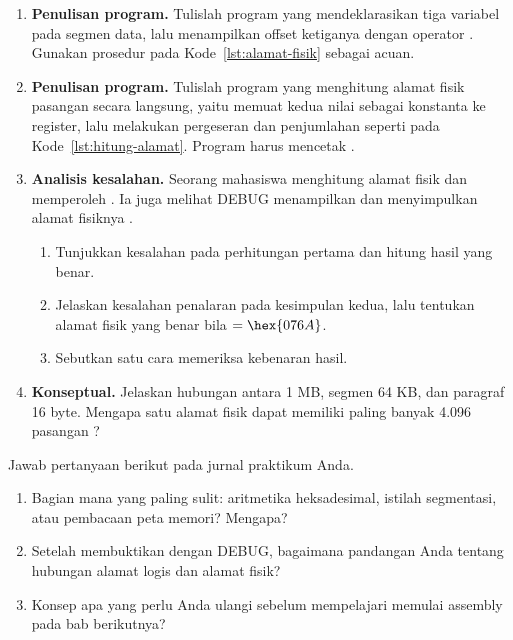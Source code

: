 \begin{enumerate}
    \item \textbf{Penulisan program.} Tulislah program yang
          mendeklarasikan tiga variabel pada segmen data, lalu
          menampilkan offset ketiganya dengan operator
          . Gunakan prosedur  pada
          Kode~\ref{lst:alamat-fisik} sebagai acuan.

    \item \textbf{Penulisan program.} Tulislah program yang
          menghitung alamat fisik pasangan 
          secara langsung, yaitu memuat kedua nilai sebagai
          konstanta ke register, lalu melakukan pergeseran dan
          penjumlahan seperti pada Kode~\ref{lst:hitung-alamat}.
          Program harus mencetak .

    \item \textbf{Analisis kesalahan.} Seorang mahasiswa menghitung
          alamat fisik  dan memperoleh
          . Ia juga melihat DEBUG menampilkan
           dan menyimpulkan alamat fisiknya
          .
          \begin{enumerate}
              \item Tunjukkan kesalahan pada perhitungan pertama
                    dan hitung hasil yang benar.
              \item Jelaskan kesalahan penalaran pada kesimpulan
                    kedua, lalu tentukan alamat fisik yang benar
                    bila  $= \hex{076A}$.
              \item Sebutkan satu cara memeriksa kebenaran hasil.
          \end{enumerate}

    \item \textbf{Konseptual.} Jelaskan hubungan antara 1 MB,
          segmen 64 KB, dan paragraf 16 byte. Mengapa satu alamat
          fisik dapat memiliki paling banyak 4.096 pasangan
          ?
\end{enumerate}

\begin{refleksibox}
\vspace{1.1em}
Jawab pertanyaan berikut pada jurnal praktikum Anda.
\begin{enumerate}
    \item Bagian mana yang paling sulit: aritmetika heksadesimal,
          istilah segmentasi, atau pembacaan peta memori? Mengapa?
    \item Setelah membuktikan  dengan DEBUG,
          bagaimana pandangan Anda tentang hubungan alamat logis
          dan alamat fisik?
    \item Konsep apa yang perlu Anda ulangi sebelum mempelajari
          memulai assembly pada bab berikutnya?
\end{enumerate}
\end{refleksibox}
